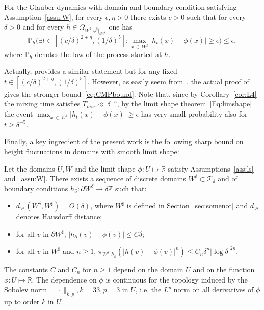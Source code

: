 \documentclass[AHL,Unicode,longabstracts,published]{cedram}
\newcommand{\R}{\mathbb{R}}
\newcommand{\Z}{\mathbb{Z}}
\renewcommand{\P}{\mathbb{P}}
\newcommand{\clT}{\mathcal{T}}
\newcommand{\clH}{\mathcal{H}}
\renewcommand{\d}{{\sharp }}
\let\oldexists\exists
\renewcommand*{\exists}{\mathrel{\oldexists}}
\begin{document}
\begin{theo}\label{thm:CMPbound}
For the Glauber dynamics with domain and boundary condition satisfying Assumption~\ref{assu:W}, for every $\epsilon,\eta>0$ there exists $c>0$ such that for every $\delta>0$ and for every $h\in\Omega_{W^\d,\phi^\d|_{\partial W^\d}}$ one has
\begin{equation}\label{eq:CMPbound}
\P_{h}\Big(\exists t\in \left[(c/\delta)^{2+\eta},(1/\delta)^5\right] :\max_{x\,\in\,W^\d}\left|h_t(x)-\phi(x)\right|\ge \epsilon\Big)\le \epsilon,
\end{equation}
where $\P_h$ denotes the law of the process started at $h$.
\end{theo}

Actually, \cite[Th.~3.1]{LT_cmp} provides a similar statement but for any fixed $t\in [(c/\delta)^{2+\eta},(1/\delta)^5]$. However, as easily seem from~\cite[Claim~6.1]{LT_cmp}, the actual proof of~\cite[Th.~3.1]{LT_cmp} gives the stronger bound~\eqref{eq:CMPbound}. Note that, since by Corollary~\ref{cor:L4} the mixing time satisfies $T_{mix}\ll \delta^{-5}$, by the limit shape theorem~\eqref{Eq:limshape} the event $\max_{x\,\in\,W^\d}|h_t(x)-\phi(x)|\ge \epsilon$ has very small probability also for $t\ge \delta^{-5}$.

Finally, a key ingredient of the present work is the following sharp bound on height fluctuations in domains with smooth limit shape:

\begin{theo}
Let the domains $U,W$ and the limit shape $\phi:U\mapsto \R$ satisfy Assumptions~\ref{ass:ls} and~\ref{assu:W}. There exists a sequence of discrete domains $W^\delta\subset \clT_\delta$ and of boundary conditions $h_\partial:\partial W^\delta\to \delta\Z$ such that:
\begin{itemize}
\item $d_{\clH}(W^\delta,W^\d)=O(\delta)$, where $W^\d$ is defined in Section~\ref{sec:somenot} and $d_{\clH}$ denotes Hausdorff distance;
\item for all $v$ in $\partial W^\d$, $ | h_\partial(v) - \phi(v) | \leq C \delta $;
\item for all $v$ in $W^\d$ and $n\geq 1$, $\pi_{W^\delta,h_\partial}(|h(v) -\phi(v)
|^n ) \leq C_n \delta^n |\log\delta|^{2n}$.
\end{itemize}
The constants $C$ and $C_n$ for $n \geq 1$ depend on the domain $U$ and on the function $\phi:U\mapsto
\R$. The dependence on $\phi$ is continuous for the topology induced by the Sobolev norm $\|\cdot\|_{k,p},k=33,p=3$ in $U$, i.e. the $L^p$ norm on all derivatives of $\phi$ up to order $k$ in $U$.\label{th:33}
\end{theo}
\end{document}

